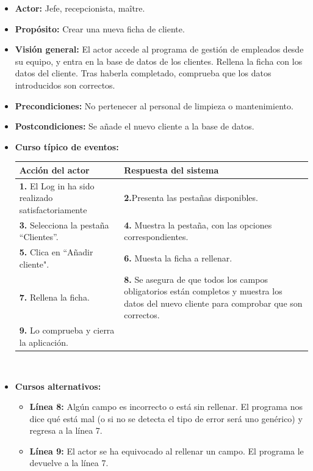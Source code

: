 \documentclass[spanish,a4paper,11pt, twoside]{report}	%
\begin{document}
			\begin{itemize}
			\item \textbf{Actor:} Jefe, recepcionista, maître.
			\item \textbf{Propósito:} Crear una nueva ficha de cliente.
			\item \textbf{Visión general:} El actor accede al programa de gestión de empleados desde su equipo, y entra en la base de datos de los clientes. Rellena la ficha con los datos del cliente. Tras haberla completado, comprueba que los datos introducidos son correctos. 
			\item \textbf{Precondiciones:} No pertenecer al personal de limpieza o mantenimiento.
			\item \textbf{Postcondiciones:} Se añade el nuevo cliente a la base de datos.
			\item \textbf{Curso típico de eventos:} 	\\
				\begin{tabular}{|p{6cm}||p{6cm}|}
				\hline
				\textbf{Acción del actor} & \textbf{Respuesta del sistema} \\ \hline \hline
				\textbf{1.} El Log in ha sido realizado satisfactoriamente & \textbf{2.}Presenta las pestañas disponibles.\\ \hline 
				\textbf{3.} Selecciona la pestaña “Clientes”. & \textbf{4.} Muestra la pestaña, con las opciones correspondientes. \\ \hline
				\textbf{5.} Clica en “Añadir cliente".	& \textbf{6.} Muesta la ficha a rellenar. \\ \hline
				\textbf{7.} Rellena la ficha. & \textbf{8.} Se asegura de que todos los campos obligatorios están completos y muestra los datos del nuevo cliente para comprobar que son correctos.\\ \hline
				\textbf{9.} Lo comprueba y cierra la aplicación. & \textbf{} \\ \hline
			\end{tabular}
			\\
			\item \textbf{Cursos alternativos:} 
			\begin{itemize}
			\item  \textbf{Línea 8:} Algún campo es incorrecto o está sin rellenar. El programa nos dice qué está mal (o si no se detecta el tipo de error será uno genérico) y regresa a la línea 7.
			\item  \textbf{Línea 9:} El actor se ha equivocado al rellenar un campo. El programa le devuelve a la línea 7.
			\end {itemize}
		\end{itemize}
\end{document}
